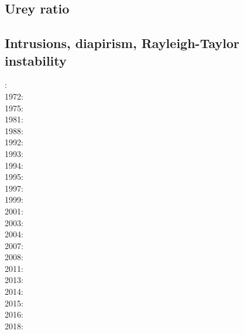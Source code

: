 \subsection{Urey ratio}

{\scriptsize
\cite{kore08}
\cite{nata12} 
}

\subsection{Intrusions, diapirism, Rayleigh-Taylor instability}

{\scriptsize
{}: \cite{ramb68}\\
1972: \cite{bers72}\\
1975: \cite{dixo75}\\
1981: \cite{brpo81}\\
1988: \cite{sccm88}\\
1992: \cite{vayv92}\cite{zaju92}\cite{wein92}\cite{wesc92}\cite{veja92}\\
1993: \cite{kesb93}\cite{nabr93}\cite{potp93}\cite{povp93}\cite{vasv93}\cite{pocp93}
      \cite{popt93}\cite{wein93}\cite{vayv93}\\
1994: \cite{wepo94}\\
1995: \cite{wepo95}\cite{bisc95}\cite{wepo95}\\
1997: \cite{wein97}\\
1999: \cite{drdv99}\\
2001: \cite{kapo01}\cite{drvc01}\\
2003: \cite{geur03}\cite{vavd03}\\
2004: \cite{gepm04}\cite{istt04}\cite{geur04}\\
2007: \cite{gebu07}\\
2008: \cite{buge08}\cite{zlfd08}\cite{mohc98}\\
2011: \cite{ellw11}\cite{pege11}\\
2013: \cite{fusc13}\\
2014: \cite{feka14b}\\
2015: \cite{feka15}\cite{fuks15}\\
2016: \cite{cakp16}\\
2018: \cite{gesr18}
}

